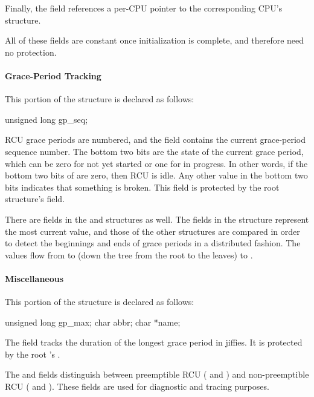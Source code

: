 Finally, the  field references a per-CPU pointer to the
corresponding CPU's  structure.

All of these fields are constant once initialization is complete, and
therefore need no protection.

\paragraph{Grace-Period Tracking}

This portion of the  structure is declared as follows:

\begin{VerbatimN}
	unsigned long gp_seq;
\end{VerbatimN}

RCU grace periods are numbered, and the  field contains the
current grace-period sequence number.
The bottom two bits are the state
of the current grace period, which can be zero for not yet started or
one for in progress. In other words, if the bottom two bits of
 are zero, then RCU is idle. Any other value in the bottom
two bits indicates that something is broken.
This field is protected by
the root  structure's  field.

There are  fields in the  and 
structures as well.
The fields in the  structure represent
the most current value, and those of the other structures are compared
in order to detect the beginnings and ends of grace periods in a
distributed fashion.
The values flow from  to 
(down the tree from the root to the leaves) to .

\paragraph{Miscellaneous}

This portion of the  structure is declared as follows:

\begin{VerbatimN}
	unsigned long gp_max;
	char abbr;
	char *name;
\end{VerbatimN}

The  field tracks the duration of the longest grace period
in jiffies.
It is protected by the root 's .

The  and  fields distinguish between preemptible RCU
( and ) and non-preemptible RCU ( and ).
These fields are used for diagnostic and tracing purposes.

